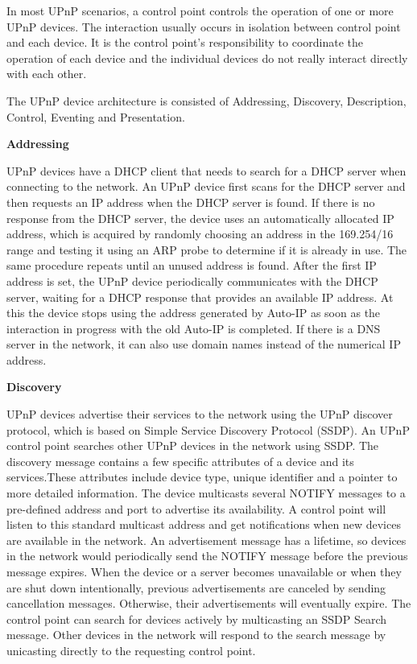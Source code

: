 In most UPnP scenarios, a control point controls the operation of one or more 
UPnP devices. The interaction usually occurs in isolation between control point 
and each device. It is the control point's responsibility to coordinate the operation of 
each device and the individual devices do not really interact directly with each other.

The UPnP device architecture \cite{upnp} \label{upnp} \label{upnpdevice} 
is consisted of Addressing, Discovery, Description, Control, Eventing and
Presentation.

\textbf{Addressing}

UPnP devices have a DHCP client that needs to search for a DHCP server when
connecting to the network. An UPnP device first scans for the DHCP server and
then requests an IP address when the DHCP server is found. If there is no
response from the DHCP server, the device uses an automatically allocated IP
address, which is acquired by randomly choosing an address in the 169.254/16
range and testing it using an ARP probe to determine if it is already in use.
The same procedure repeats until an unused address is found. After the first IP
address is set, the UPnP device periodically communicates with the DHCP server,
waiting for a DHCP response that provides an available IP address. At this the
device stops using the address generated by Auto-IP as soon as the interaction
in progress with the old Auto-IP is completed. If there is a DNS server in the
network, it can also use domain names instead of the numerical IP address.

\textbf{Discovery} 

UPnP devices advertise their services to the network using the UPnP discover protocol, which is based on 
Simple Service Discovery Protocol (SSDP). An UPnP control point searches other UPnP devices in the network using SSDP. The discovery message contains a few specific attributes 
of a device and its services.These attributes include device type, unique identifier and a 
pointer to more detailed information. The device multicasts several NOTIFY
messages to a pre-defined address and port to advertise its availability. A control point will listen to this standard multicast address and get 
notifications when new devices are available in the network. 
An advertisement message has a lifetime, so devices in the network would periodically send 
the NOTIFY message before the previous message expires. When the device or a server becomes unavailable or when they are shut down intentionally, previous advertisements are canceled by sending cancellation messages. Otherwise, their advertisements will eventually expire. 
The control point can search for devices actively by multicasting an SSDP Search message. Other devices 
in the network will respond to the search message by unicasting directly to the
requesting control point.

